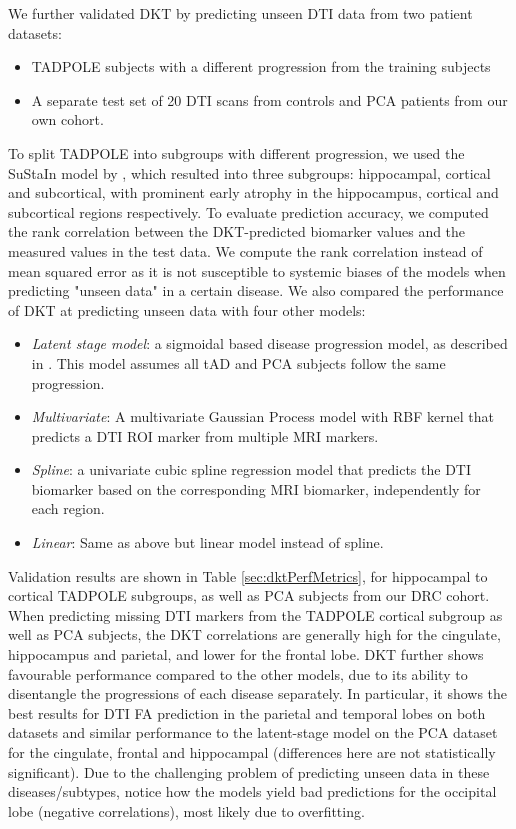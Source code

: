 We further validated DKT by predicting unseen DTI data from two patient datasets:
\begin{itemize}
 \item TADPOLE subjects with a different progression from the training subjects
 \item A separate test set of 20 DTI scans from controls and PCA patients from our own cohort.
\end{itemize}

To split TADPOLE into subgroups with different progression, we used the SuStaIn model by \cite{young2018uncovering}, which resulted into three subgroups: hippocampal, cortical and subcortical, with prominent early atrophy in the hippocampus, cortical and subcortical regions respectively. To evaluate prediction accuracy, we computed the rank correlation between the DKT-predicted biomarker values and the measured values in the test data. We compute the rank correlation instead of mean squared error as it is not susceptible to systemic biases of the models when predicting "unseen data" in a certain disease. We also compared the performance of DKT at predicting unseen data with four other models: 
\begin{itemize}
 \item \emph{Latent stage model}: a sigmoidal based disease progression model, as described in \cite{jedynak2012computational}. This model assumes all tAD and PCA subjects follow the same progression.
 \item \emph{Multivariate}: A multivariate Gaussian Process model with RBF kernel that predicts a DTI ROI marker from multiple MRI markers.
 \item \emph{Spline}: a univariate cubic spline regression model that predicts the DTI biomarker based on the corresponding MRI biomarker, independently for each region.
 \item \emph{Linear}: Same as above but linear model instead of spline.
\end{itemize}



Validation results are shown in Table \ref{sec:dktPerfMetrics}, for hippocampal to cortical TADPOLE subgroups, as well as PCA subjects from our DRC cohort. When predicting missing DTI markers from the TADPOLE cortical subgroup as well as PCA subjects, the DKT correlations are generally high for the cingulate, hippocampus and parietal, and lower for the frontal lobe. DKT further shows favourable performance compared to the other models, due to its ability to disentangle the progressions of each disease separately. In particular, it shows the best results for DTI FA prediction in the parietal and temporal lobes on both datasets and similar performance to the latent-stage model on the PCA dataset for the cingulate, frontal and hippocampal (differences here are not statistically significant). Due to the challenging problem of predicting unseen data in these diseases/subtypes, notice how the models yield bad predictions for the occipital lobe (negative correlations), most likely due to overfitting.


